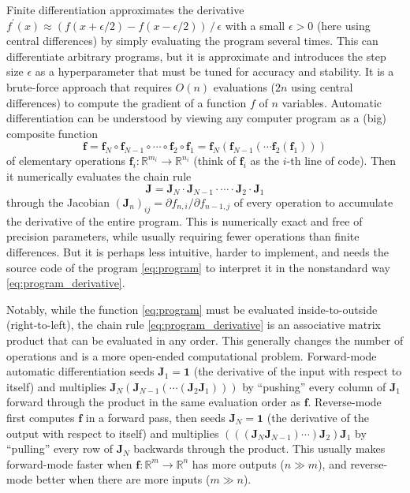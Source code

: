 \documentclass{aa}
\begin{document}
Finite differentiation approximates the derivative $f^\prime(x) \approx (f(x+\epsilon/2) - f(x-\epsilon/2)) \,/\, \epsilon$ with a small $\epsilon > 0$ (here using central differences) by simply evaluating the program several times.
This can differentiate arbitrary programs, but it is approximate and introduces the step size $\epsilon$ as a hyperparameter that must be tuned for accuracy and stability. It is a brute-force approach that requires $O(n)$ evaluations ($2n$ using central differences) to compute the gradient of a function $f$ of $n$ variables.
Automatic differentiation \citep[e.g.,][]{griewankEvaluatingDerivatives2008} can be understood by viewing any computer program as a (big) composite function%
\begin{equation}
    \boldsymbol{f} = \boldsymbol{f}_N \circ \boldsymbol{f}_{N-1} \circ \cdots \circ \boldsymbol{f}_2 \circ \boldsymbol{f}_1 = \boldsymbol{f}_N(\boldsymbol{f}_{N-1}( \cdots \boldsymbol{f}_2(\boldsymbol{f}_1)))
\label{eq:program}
\end{equation}
of elementary operations $\boldsymbol{f}_i: \mathbb{R}^{m_i} \rightarrow \mathbb{R}^{n_i}$ (think of $\boldsymbol{f}_i$ as the $i$-th line of code).
Then it numerically evaluates the chain rule%
\begin{equation}
    \boldsymbol{J} = \boldsymbol{J}_N \cdot \boldsymbol{J}_{N-1} \cdot \cdots \cdot \boldsymbol{J}_2 \cdot \boldsymbol{J}_1
\label{eq:program_derivative}
\end{equation}
through the Jacobian $(\boldsymbol{J}_n)_{ij} = \partial f_{n,i} / \partial f_{n-1,j}$ of every operation to accumulate the derivative of the entire program.
This is numerically exact and free of precision parameters, while usually requiring fewer operations than finite differences.
But it is perhaps less intuitive, harder to implement, and needs the source code of the program \eqref{eq:program} to interpret it in the nonstandard way \eqref{eq:program_derivative}.

Notably, while the function \eqref{eq:program} must be evaluated inside-to-outside (right-to-left),
the chain rule \eqref{eq:program_derivative} is an associative matrix product that can be evaluated in any order.
This generally changes the number of operations and is a more open-ended computational problem.
Forward-mode automatic differentiation seeds $\boldsymbol{J}_1 = \boldsymbol{1}$ (the derivative of the input with respect to itself) and multiplies $\boldsymbol{J}_N (\boldsymbol{J}_{N-1} (\cdots (\boldsymbol{J}_2 \boldsymbol{J}_1)))$ by \enquote{pushing} every column of $\boldsymbol{J}_1$ forward through the product in the same evaluation order as $\boldsymbol{f}$.
Reverse-mode first computes $\boldsymbol{f}$ in a forward pass, then seeds $\boldsymbol{J}_N = \boldsymbol{1}$ (the derivative of the output with respect to itself) and multiplies $(((\boldsymbol{J}_N \boldsymbol{J}_{N-1}) \cdots) \boldsymbol{J}_2) \boldsymbol{J}_1$ by \enquote{pulling} every row of $\boldsymbol{J}_N$ backwards through the product.
This usually makes forward-mode faster when $\boldsymbol{f}: \mathbb{R}^m \rightarrow \mathbb{R}^n$ has more outputs ($n \gg m$), and reverse-mode better when there are more inputs ($m \gg n$).
\end{document}
